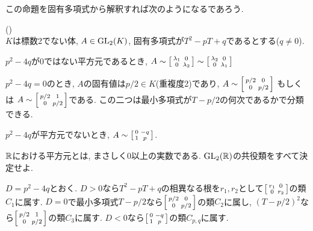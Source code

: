 この命題を固有多項式から解釈すれば次のようになるであろう.
\begin{cor} ()\\
$K$は標数2でない体, $A \in \mathrm{GL}_{2}(K)$, 固有多項式が$T^2 - pT + q$であるとする($q\neq 0$).
\ben
\item $p^2 - 4q$が$0$ではない平方元であるとき, $A\sim \left[\begin{smallmatrix}\lambda_1 & 0 \\ 0 & \lambda_2\end{smallmatrix}\right] \sim \left[\begin{smallmatrix}\lambda_2 & 0 \\ 0 & \lambda_1\end{smallmatrix}\right]$
\item $p^2 - 4q = 0$のとき, $A$の固有値は$p/2\in K$(重複度2)であり, $A\sim \left[\begin{smallmatrix}p/2 & 0 \\ 0 & p/2\end{smallmatrix}\right]$ もしくは $A\sim \left[\begin{smallmatrix}p/2 & 1\\ 0 & p/2\end{smallmatrix}\right]$である. この二つは最小多項式が$T-p/2$の何次であるかで分類できる.
\item $p^2 - 4q$が平方元でないとき, $A\sim \left[\begin{smallmatrix}0 & -q \\ 1 & p\end{smallmatrix}\right]$.
\een
\end{cor}
\begin{egprob}
$\mathbb{R}$における平方元とは, まさしく0以上の実数である. $\mathrm{GL}_{2}(\mathbb{R})$の共役類をすべて決定せよ.
\end{egprob}
\begin{egans} $D = p^2-4q$とおく. $D>0$なら$T^2-pT + q$の相異なる根を$r_1,r_2$として$\left[\begin{smallmatrix}r_1 & 0 \\ 0 & r_2\end{smallmatrix}\right]$の類$C_1$に属す. $D = 0$で最小多項式$T- p/2$なら$\left[\begin{smallmatrix}p/2 & 0 \\ 0 & p/2\end{smallmatrix}\right]$の類$C_2$に属し, $(T-p/2)^2$なら$\left[\begin{smallmatrix}p/2 & 1 \\ 0 & p/2\end{smallmatrix}\right]$の類$C_3$に属す. $D<0$なら$\left[\begin{smallmatrix}0 & -q \\ 1 & p\end{smallmatrix}\right]$の類$C_{p,q}$に属す.
\end{egans}

